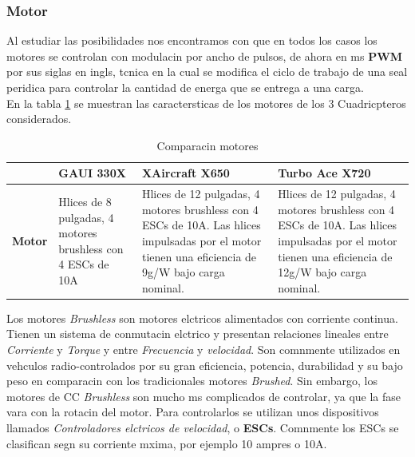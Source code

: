 \documentclass[spanish,12pt,a4paper,titlepage]{report}
\begin{document}
\subsubsection*{Motor}
Al estudiar las posibilidades nos encontramos con que en todos los casos los motores se controlan con modulacin por ancho de pulsos, de ahora en ms \textbf{PWM} por sus siglas en ingls, tcnica en la cual se modifica el ciclo de trabajo de una seal peridica para controlar la cantidad de energa que se entrega a una carga.\\

	En la tabla \ref{tab:motor} se muestran las caractersticas de los motores de los 3 Cuadricpteros considerados.\\

\begin{table}[H]
\begin{tabular}{p{40pt}|p{80pt}|p{130pt}|p{130pt}|} 
\cline{2-4}
& \cellcolor[gray]{0.8} \textbf{GAUI 330X} 
& \cellcolor[gray]{0.8} \textbf{XAircraft X650} 
& \cellcolor[gray]{0.8} \textbf{Turbo Ace X720} \\ \cline{2-4} \hline
\multicolumn{1}{|p{40pt}|}{\cellcolor[gray]{0.8}\textbf{Motor}} 
& Hlices de 8 pulgadas, 4 motores brushless con 4 ESCs de 10A 
& Hlices de 12 pulgadas, 4 motores brushless con 4 ESCs de 10A. Las hlices impulsadas por el motor tienen una eficiencia de 9g/W bajo carga nominal. 
& Hlices de 12 pulgadas, 4 motores brushless con 4 ESCs de 10A. Las hlices impulsadas por el motor tienen una eficiencia de 12g/W bajo carga nominal.\\ \hline
\end{tabular} 
\caption{Comparacin motores}
\label{tab:motor}
\end{table}

	Los motores \emph{Brushless} son motores elctricos alimentados con corriente continua. Tienen un sistema de conmutacin elctrico y presentan relaciones lineales entre \emph{Corriente} y \emph{Torque} y entre \emph{Frecuencia} y \emph{velocidad}. Son comnmente utilizados en vehculos radio-controlados por su gran eficiencia, potencia, durabilidad y su bajo peso en comparacin con los tradicionales motores \emph{Brushed}. Sin embargo, los motores de CC \emph{Brushless} son mucho ms complicados de controlar, ya que la fase vara con la rotacin del motor. Para controlarlos se utilizan unos dispositivos llamados \emph{Controladores elctricos de velocidad}, o \textbf{ESCs}. Comnmente los ESCs se clasifican segn su corriente mxima, por ejemplo 10 ampres o 10A.\\
\end{document}
